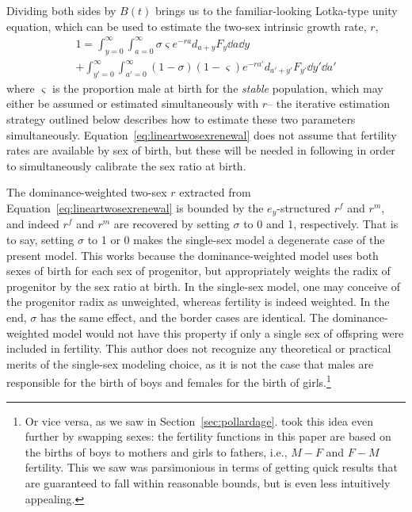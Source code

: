 Dividing both sides by $B(t)$ brings us to the familiar-looking
Lotka-type unity equation, which can be used to estimate the two-sex intrinsic
growth rate, $r$,
\begin{equation}
\begin{split}
\label{eq:lineartwosexrenewal}
1 = \int_{y=0}^\infty \int_{a=0}^\infty \sigma \varsigma e^{-ra}d_{a+y} 
F_y \dd a \dd y \\+ \int_{y'=0}^\infty \int_{a'=0}^\infty (1-\sigma)
(1-\varsigma) e^{-ra'}d_{a'+y'} F_{y'} \dd y' \dd a'
\end{split}
\end{equation} 
where $\varsigma$ is the proportion male at birth for the \textit{stable}
population, which may either be assumed or estimated simultaneously with $r$-- the 
iterative estimation strategy outlined below describes how to estimate these two
parameters simultaneously. Equation~\eqref{eq:lineartwosexrenewal} does 
not assume that fertility rates are available by sex of birth, but these will be needed in following in order to simultaneously
calibrate the sex ratio at birth.

The dominance-weighted two-sex $r$ extracted from
Equation~\eqref{eq:lineartwosexrenewal} is bounded by the $e_y$-structured $r^f$
and $r^m$, and indeed $r^f$ and $r^m$ are recovered by setting $\sigma$ to 0 and 1,
respectively. That is to say, setting $\sigma$ to 1 or 0 makes the single-sex
model a degenerate case of the present model. This works because the
dominance-weighted model uses both sexes of birth for each sex of progenitor,
but appropriately weights the radix of progenitor by the sex ratio at birth.
In the single-sex model, one may conceive of the progenitor radix as
unweighted, whereas fertility is indeed weighted. In the end, $\sigma$ has the
same effect, and the border cases are identical. The dominance-weighted model
would not have this property if only a single sex of offspring were included in
 fertility. This author does not recognize any theoretical or practical merits
 of the single-sex modeling choice, as it is not the case that males are 
 responsible for the birth of boys and females for the birth of 
 girls.\footnote{Or vice versa, as we saw in
 Section~\ref{sec:pollardage}. \citet{pollard1948measurement} took this idea
 even further by swapping sexes: the fertility functions in this paper 
 are based on the births of boys to mothers and girls to 
fathers, i.e., $M-F$ and $F-M$ fertility. This we saw was parsimonious in terms 
of getting quick results that are guaranteed to fall within reasonable 
bounds, but is even less intuitively appealing.}

